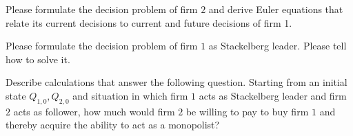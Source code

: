 \medskip
{}   Please formulate the decision problem of firm $2$ and derive  Euler equations that relate its current
decisions to  current and future decisions of firm 1.

\medskip
{} Please formulate the decision problem of firm $1$ as Stackelberg leader.  Please tell how to solve it.
%


\medskip
{}  Describe calculations that answer the following question.  Starting from an initial state $Q_{1,0}, Q_{2,0}$ and situation in which
firm $1$ acts as Stackelberg leader and firm $2$ acts as follower, how much would firm $2$ be willing to pay to buy  firm $1$ and thereby acquire the ability to act as
a monopolist?


\bye






\bye
